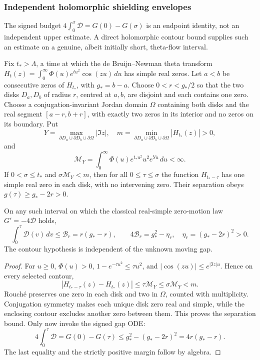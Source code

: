 \subsubsection{Independent holomorphic shielding envelopes}
\label{subsec:holomorphic-shielding}

The signed budget $4\int_0^\sigma \mathcal D=G(0)-G(\sigma)$
is an endpoint identity, not an independent upper estimate.
A direct holomorphic contour bound supplies such an estimate
on a genuine, albeit initially short, theta-flow interval.

\begin{theorem}
\label{thm:rouche-shielding-independent}
Fix $t_*>\Lambda$, a time at which the de Bruijn--Newman
theta transform
$H_t(z)=\int_0^\infty \Phi(u)e^{tu^2}\cos(zu)\,du$
has simple real zeros. Let $a<b$ be consecutive zeros of
$H_{t_*}$, with $g_*=b-a$. Choose $0<r<g_*/2$
so that the two disks $D_a,D_b$ of radius $r$, centred
at $a,b$, are disjoint and each contains one zero.
Choose a conjugation-invariant Jordan domain $\Omega$
containing both disks and the real segment $[a-r,b+r]$,
with exactly two zeros in its interior and no zeros
on its boundary. Put
\[
Y=\max_{\partial D_a\cup\partial D_b\cup\partial\Omega}
|\Im z|,\quad
m=\min_{\partial D_a\cup\partial D_b\cup\partial\Omega}
|H_{t_*}(z)|>0,
\]
and
\[
\mathcal M_Y=\int_0^\infty
\Phi(u)e^{t_*u^2}u^2e^{Yu}\,du<\infty.
\]
If $0<\sigma\le t_*$ and $\sigma\mathcal M_Y<m$,
then for all $0\le\tau\le\sigma$ the function
$H_{t_*-\tau}$ has one simple real zero in each
disk, with no intervening zero. Their separation
obeys $g(\tau)\ge g_*-2r>0$.

On any such interval on which the classical real-simple
zero-motion law $G'=-4\mathcal D$ holds,
\begin{equation}
\boxed{
\int_0^\tau\mathcal D(v)\,dv
\le\mathcal B_r=r(g_*-r),\qquad
4\mathcal B_r=g_*^2-\eta_r,\quad
\eta_r=(g_*-2r)^2>0.}
\label{eq:rouche-independent-shielding}
\end{equation}
The contour hypothesis is independent of
the unknown moving gap.
\end{theorem}
\begin{proof}
For $u\ge0$, $\Phi(u)>0$,
$1-e^{-\tau u^2}\le\tau u^2$,
and $|\cos(zu)|\le e^{|\Im z|u}$. Hence
on every selected contour,
\[
|H_{t_*-\tau}(z)-H_{t_*}(z)|
\le\tau\mathcal M_Y\le\sigma\mathcal M_Y<m.
\]
Rouch\'e preserves one zero in each disk
and two in $\Omega$, counted with multiplicity.
Conjugation symmetry makes each unique disk zero
real and simple, while the enclosing contour excludes
another zero between them. This proves the separation
bound. Only now invoke the signed gap ODE:
\[
4\int_0^\tau\mathcal D
=G(0)-G(\tau)
\le g_*^2-(g_*-2r)^2=4r(g_*-r).
\]
The last equality and the strictly positive margin
follow by algebra.
\end{proof}

